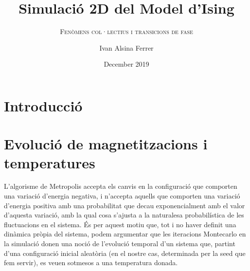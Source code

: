 \documentclass[a4paper]{article}
\title{\textbf{Simulació 2D del Model d'Ising}}
\subtitle{\scshape{Fenòmens col·lectius i transicions de fase}}
\author{Ivan Alsina Ferrer}
\date{December 2019}
\begin{document}
\maketitle

\section{Introducció}

\section{Evolució de magnetitzacions i temperatures}

L'algorisme de Metropolis accepta els canvis en la configuració que comporten una variació d'energia negativa, i n'accepta aquells que comporten una variació d'energia positiva amb una probabilitat que decau exponencialment amb el valor d'aquesta variació, amb la qual cosa s'ajusta a la naturalesa probabilística de les fluctuacions en el sistema. És per aquest motiu que, tot i no haver definit una dinàmica pròpia del sistema, podem argumentar que les iteracions Montecarlo en la simulació donen una noció de l'evolució temporal d'un sistema que, partint d'una configuració inicial aleatòria (en el nostre cas, determinada per la seed que fem servir), es veuen sotmesos a una temperatura donada.
\end{document}
